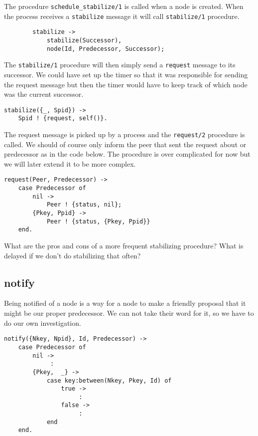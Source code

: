 \documentclass[a4paper,11pt]{article}
\begin{document}
The procedure {\tt schedule\_stabilize/1} is called when a node is
created. When the process receives a {\tt stabilize} message it will
call {\tt stabilize/1} procedure. 

\begin{verbatim}
        stabilize ->
            stabilize(Successor),
            node(Id, Predecessor, Successor);
\end{verbatim}


The {\tt stabilize/1} procedure will then simply send a {\tt request}
message to its successor. We could have set up the timer so that it was
responsible for sending the request message but then the timer would
have to keep track of which node was the current successor. 

\begin{verbatim}
stabilize({_, Spid}) ->
    Spid ! {request, self()}.
\end{verbatim}

The request message is picked up by a process and the {\tt request/2}
procedure is called. We should of course only inform the peer that
sent the request about or predecessor as in the code below. The
procedure is over complicated for now but we will later extend it to be
more complex.

\begin{verbatim}
request(Peer, Predecessor) ->
    case Predecessor of
        nil ->
            Peer ! {status, nil};
        {Pkey, Ppid} ->
            Peer ! {status, {Pkey, Ppid}}
    end.
\end{verbatim}

What are the pros and cons of a more frequent stabilizing
procedure? What is delayed if we don't do stabilizing that often?

\subsection{notify}

Being notified of a node is a way for a node to make a friendly
proposal that it might be our proper predecessor. We can not take
their word for it, so we have to do our own investigation.

\begin{verbatim}
notify({Nkey, Npid}, Id, Predecessor) ->
    case Predecessor of
        nil ->
             :
        {Pkey,  _} ->
            case key:between(Nkey, Pkey, Id) of
                true ->
                     :
                false -> 
                     :
            end
    end.
\end{verbatim}
\end{document}
